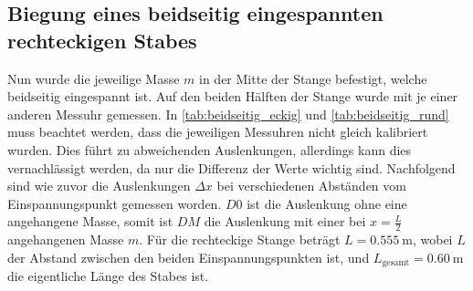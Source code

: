 \FloatBarrier
\subsection{Biegung eines beidseitig eingespannten rechteckigen Stabes}
\label{sec:Biegung eines beidseitig eingespannten rechteckigen Stabes}

Nun wurde die jeweilige Masse $m$ in der Mitte der Stange befestigt, welche beidseitig eingespannt ist.
Auf den beiden Hälften der Stange wurde mit je einer anderen Messuhr gemessen.
In \autoref{tab:beidseitig_eckig} und \autoref{tab:beidseitig_rund} muss beachtet werden, dass die jeweiligen Messuhren nicht gleich kalibriert wurden. 
Dies führt zu abweichenden Auslenkungen, allerdings kann dies vernachlässigt werden, da nur die Differenz der Werte wichtig sind. 
Nachfolgend sind wie zuvor die Auslenkungen $\Delta x$ bei verschiedenen Abständen vom Einspannungspunkt gemessen worden. $D0$ ist die Auslenkung ohne eine angehangene Masse, somit ist $DM$ die Auslenkung mit einer bei $x=\frac{L}{2}$ angehangenen Masse $m$. 
Für die rechteckige Stange beträgt $L = \SI{0.555}{\meter}$, wobei $L$ der Abstand zwischen den beiden Einspannungspunkten ist, und $L_\text{gesamt} = \SI{0.60}{\meter}$ die eigentliche Länge des Stabes ist.
